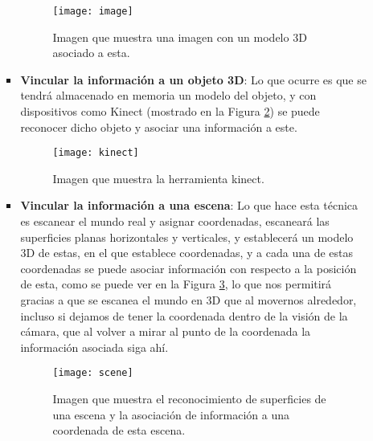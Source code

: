 \begin{itemize}
\begin{itemize}
\begin{itemize}
  \begin{figure}[h]
    \centering
    \texttt{[image: image]}
    \caption{Imagen que muestra una imagen con un modelo 3D asociado a esta.\protect\footnotemark}
    \label{figura-image}
  \end{figure}


  \newpage

  \item \textbf{Vincular la información a un objeto 3D}: Lo que ocurre es que se tendrá almacenado en memoria un modelo del objeto, y con dispositivos como Kinect (mostrado en la Figura \ref{figura-kinect}) se puede reconocer dicho objeto y asociar una información a este.

  \begin{figure}[h]
    \centering
    \texttt{[image: kinect]}
    \caption{Imagen que muestra la herramienta kinect.\protect\footnotemark}
    \label{figura-kinect}
  \end{figure}


  \item \textbf{Vincular la información a una escena}:  Lo que hace esta técnica es escanear el mundo real y asignar coordenadas, escaneará las superficies planas horizontales y verticales, y establecerá un modelo 3D de estas, en el que establece coordenadas, y a cada una de estas coordenadas se puede asociar información con respecto a la posición de esta, como se puede ver en la Figura \ref{figura-scene}, lo que nos permitirá gracias a que se escanea el mundo en 3D que al movernos alrededor, incluso si dejamos de tener la coordenada dentro de la visión de la cámara, que al volver a mirar al punto de la coordenada la información asociada siga ahí.

  \begin{figure}[h]
    \centering
    \texttt{[image: scene]}
    \caption{Imagen que muestra el reconocimiento de superficies de una escena y la asociación de información a una coordenada de esta escena.\protect\footnotemark}
    \label{figura-scene}
  \end{figure}



\end{itemize}
\end{itemize}
\end{itemize}
